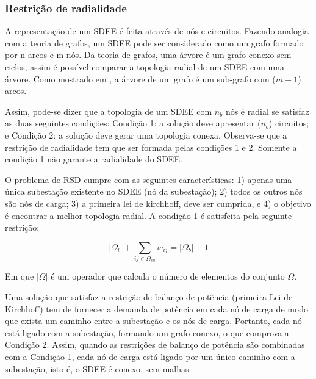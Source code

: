 \subsubsection{Restrição de radialidade}

A representação de um SDEE é feita através de nós e circuitos. Fazendo analogia com a teoria de grafos, um SDEE pode ser considerado como um grafo formado por n arcos e m nós.
Da teoria de grafos, uma árvore é um grafo conexo sem ciclos, assim é possível comparar a topologia radial de um SDEE com uma árvore.
Como mostrado em \cite{Bazaraa1990LinearFlows}, a árvore de um grafo é um sub-grafo com ($m-1$) arcos.

Assim, pode-se dizer que a topologia de um SDEE com $n_{b}$ nós é radial se satisfaz as duas seguintes condições: Condição 1: a solução deve apresentar ($n_{b}$) circuitos; e Condição 2: a solução deve gerar uma topologia conexa. Observa-se que a restrição de radialidade tem que ser formada pelas condições 1 e 2.
Somente a condição 1 não garante a radialidade do SDEE. 

O problema de RSD cumpre com as seguintes características: 1) apenas uma única subestação existente no SDEE (nó da subestação); 2) todos os outros nós são nós de carga; 3) a primeira lei de kirchhoff, deve ser cumprida, e 4) o objetivo é encontrar a melhor topologia radial. 
A condição 1 é satisfeita pela seguinte restrição:

\begin{equation}
    |\Omega_{l}| + \sum_{ij\in\Omega_{ch}}w_{ij} = |\Omega_{b}| - 1
    \label{eq:radialidade}
\end{equation}

Em que $|\Omega|$ é um operador que calcula o número de elementos do conjunto $\Omega$.

Uma solução que satisfaz a restrição de balanço de potência (primeira Lei de Kirchhoff) tem de fornecer a demanda de potência em cada nó de carga de modo que exista um caminho entre a subestação e os nós de carga. Portanto, cada nó está ligado com a subestação, formando um grafo conexo, o que comprova a Condição 2. 
Assim, quando as restrições de balanço de potência são combinadas com a Condição 1, cada nó de carga está ligado por um único caminho com a subestação, isto é, o SDEE é conexo, sem malhas.

